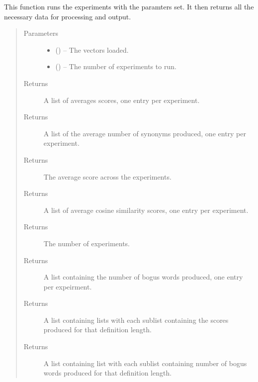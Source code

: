 \documentclass[letterpaper,10pt,english]{sphinxmanual}
\begin{document}
\begin{fulllineitems}
\label{\detokenize{code:hp_spells.run_experiment}}
This function runs the experiments with the paramters set. 
It then returns all the necessary data for processing and output.
\begin{quote}\begin{description}
\item[{Parameters}] \leavevmode\begin{itemize}
\item {} 
 () -- The vectors loaded.

\item {} 
 () -- The number of experiments to run.

\end{itemize}

\item[{Returns}] \leavevmode
A list of averages scores, one entry per experiment.

\item[{Returns}] \leavevmode
A list of the average number of synonyms produced, one  entry per experiment.

\item[{Returns}] \leavevmode
The average score across the experiments.

\item[{Returns}] \leavevmode
A list of average cosine similarity scores, one entry per experiment.

\item[{Returns}] \leavevmode
The number of experiments.

\item[{Returns}] \leavevmode
A list containing the number of bogus words produced, one entry per expeirment.

\item[{Returns}] \leavevmode
A list containing lists with each sublist containing the scores produced for that definition length.

\item[{Returns}] \leavevmode
A list containing list with each sublist containing number of bogus words produced for that definition length.

\end{description}\end{quote}

\end{fulllineitems}
\end{document}
